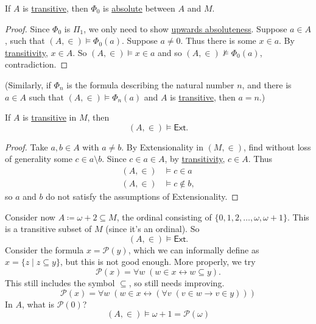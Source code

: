 \documentclass{article}
\newcommand{\named}[1]{\textbf{#1}\index{#1}}
\let\models\vDash
\let\nModels\nvDash
\begin{document}
\begin{prop}
  If $A$ is \hyperlink{def:transitive}{transitive}, then \hyperlink{def:phi0}{$\Phi_0$} is \hyperlink{def:abso}{absolute} between $A$ and $M$.
\end{prop}
\begin{proof}
  Since \hyperlink{def:phi0}{$\Phi_0$} is \hyperlink{def:pi1}{$\Pi_1$}, we only need to show \hyperlink{def:abso}{upwards absoluteness}.
  Suppose $a \in A$, such that $(A,\in) \models \Phi_0(a)$.
  Suppose $a \neq 0$. Thus there is some $x \in a$. By \hyperlink{def:transitive}{transitivity}, $x \in A$.
  So $(A,\in) \models x \in a$ and so $(A,\in) \nModels \Phi_0(a)$, contradiction.
\end{proof}
(Similarly, if $\Phi_n$ is the formula describing the natural number $n$, and there is $a \in A$ such that $(A,\in) \models \Phi_n(a)$ and $A$ is \hyperlink{def:transitive}{transitive}, then $a = n$.)
\begin{prop}
  If $A$ is \hyperlink{def:transitive}{transitive} in $M$, then
  \begin{equation*}
    (A,\in) \models \textsf{Ext}.
  \end{equation*}
\end{prop}
\begin{proof}
  Take $a,b \in A$ with $a \neq b$.
  By Extensionality in $(M,\in)$, find without loss of generality some $c \in a \setminus b$.
  Since $c \in a \in A$, by \hyperlink{def:transitive}{transitivity}, $c \in A$.
  Thus
  \begin{align*}
    (A,\in) &\models c \in a \\
    (A,\in) &\models c \notin b,
  \end{align*}
  so $a$ and $b$ do not satisfy the assumptions of Extensionality.
\end{proof}

Consider now $A \coloneqq \omega + 2 \subseteq M$, the ordinal consisting of $\{0,1,2,\dotsc, \omega, \omega+1\}$.
This is a transitive subset of $M$ (since it's an ordinal).
So
\begin{equation*}
  (A,\in) \models \textsf{Ext}.
\end{equation*}
Consider the formula $x = \mathcal{P}(y)$, which we can informally define as $x = \{z \mid z \subseteq y\}$, but this is not good enough. More properly, we try
\begin{equation*}
  \mathcal{P}(x) = \forall w \; (w \in x \leftrightarrow w \subseteq y).
\end{equation*}
This still includes the symbol $\subseteq$, so still needs improving.
\begin{equation*}
  \mathcal{P}(x) = \forall w \; (w \in x \leftrightarrow (\forall v \; (v \in w \rightarrow v \in y)))
\end{equation*}
In $A$, what is $\mathcal{P}(0)$?
\begin{equation*}
  (A,\in) \models \omega + 1 = \mathcal{P}(\omega)
\end{equation*}
\end{document}
